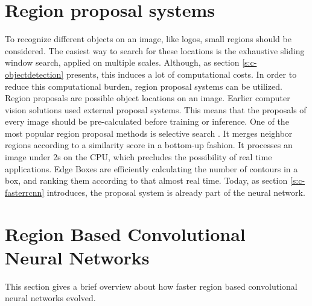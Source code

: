 \section{Region proposal systems}\label{s:c-rpn}
To recognize different objects on an image, like logos, small regions should be considered. The easiest way to search for these locations is the exhaustive sliding window search, applied on multiple scales. Although, as section \ref{s:c-objectdetection} presents, this induces a lot of computational costs. In order to reduce this computational burden, region proposal systems can be utilized. Region proposals are possible object locations on an image.
\smallbreak
Earlier computer vision solutions used external proposal systems. This means that the proposals of every image should be pre-calculated before training or inference. One of the most popular region proposal methods is selective search \cite{Uijlings13}. It merges neighbor regions according to a similarity score in a bottom-up fashion. It processes an image under 2s on the CPU, which precludes the possibility of real time applications. Edge Boxes \cite{edge-boxes-locating-object-proposals-from-edges} are efficiently calculating the number of contours in a box, and ranking them according to that almost real time. Today, as section \ref{s:c-fasterrcnn} introduces, the proposal system is already part of the neural network.

\section{Region Based Convolutional Neural Networks}\label{s:c-rcnn}

This section gives a brief overview about how faster region based convolutional neural networks evolved.

